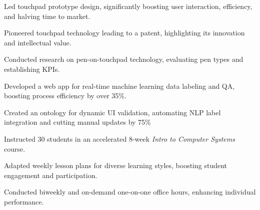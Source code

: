 \documentclass[]{resume-openfont}
\begin{document}
\begin{minipage}[t]{1\textwidth}
        \begin{tightemize}
            \item Led touchpad prototype design, significantly boosting user interaction, efficiency, and halving time to market.
            \item Pioneered touchpad technology leading to a patent, highlighting its innovation and intellectual value.
            \item Conducted research on pen-on-touchpad technology, evaluating pen types and establishing KPIs.
        \end{tightemize}

        \begin{tightemize}
            \item Developed a web app for real-time machine learning data labeling and QA, boosting process efficiency by over 35\%.
            \item Created an ontology for dynamic UI validation, automating NLP label integration and cutting manual updates by 75\%
        \end{tightemize}

        \begin{tightemize}
            \item Instructed 30 students in an accelerated 8-week {\it Intro to Computer Systems} course.
            \item Adapted weekly lesson plans for diverse learning styles, boosting student engagement and participation.
            \item Conducted biweekly and on-demand one-on-one office hours, enhancing individual performance.
        \end{tightemize}
    \end{minipage}
\end{document}
